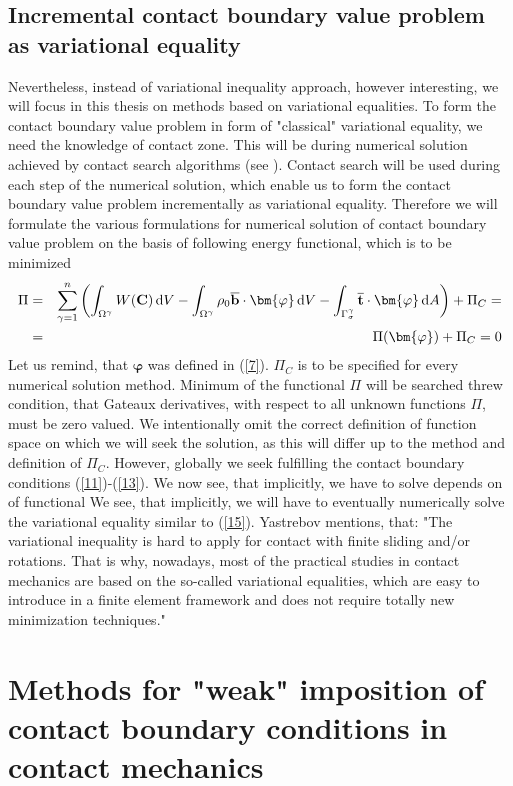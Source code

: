 \documentclass{article}
\newcommand{\bea}{\begin{eqnarray}}
\newcommand{\eea}{\end{eqnarray}}
\newcommand{\dd}{\,{\rm d}}
\begin{document}
\subsection{Incremental contact boundary value problem as variational equality}
Nevertheless, instead of variational inequality approach, however interesting, we will focus in this thesis on methods based on variational equalities. To form the contact boundary value problem in form of "classical" variational equality, we need the knowledge of contact zone. This will be during numerical solution achieved by contact search algorithms (see \cite[Chapter 9]{Wriggers}). Contact search will be used during each step of the numerical solution, which enable us to form the contact boundary value problem incrementally as variational equality. Therefore we will formulate the various formulations for numerical solution of contact boundary value problem on the basis of following energy functional, which is to be minimized
\bea\label{20}
\Pi&=&\sum^{n}_{\gamma = 1}\left(\int_{\Omega^{\gamma}} W(\mathbf{C})\dd V-\int_{\Omega^{\gamma}} \rho_{0}\overline{\mathbf{b}} \cdot \mathbf{\bm{\varphi}} \dd V-\int_{\Gamma_{\sigma}^{\gamma}} \overline{\mathbf{t}} \cdot \mathbf{\bm{\varphi}} \dd A\right) + \Pi_{C}=
\nonumber
\\
&=&\Pi(\bm{\varphi})+ \Pi_{C} = 0
\eea
Let us remind, that $ \mathbf{\bm{\varphi}} $ was defined in (\ref{7}). $ \Pi_{C} $ is to be specified for every numerical solution method. Minimum of the functional $ \Pi $ will be searched threw condition, that Gateaux derivatives, with respect to all unknown functions $ \Pi $, must be zero valued. We intentionally omit the correct definition of function space on which we will seek the solution, as this will differ up to the method and definition of $ \Pi_{C} $. However, globally we seek fulfilling the contact boundary conditions (\ref{11})-(\ref{13}). We now see, that implicitly, we have to solve  depends on  of functional  We see, that implicitly, we will have to eventually numerically solve the variational equality similar to (\ref{15}). Yastrebov \cite[Chapter 4, p.144]{Yastrebov} mentions, that: "The variational inequality is hard to apply for contact with finite sliding and/or rotations. That is why, nowadays, most of the practical studies in contact mechanics are based on the
so-called variational equalities, which are easy to introduce in a finite element
framework and does not require totally new minimization techniques."   
\newpage
\section{Methods for "weak" imposition of contact boundary conditions in contact mechanics}
\end{document}
